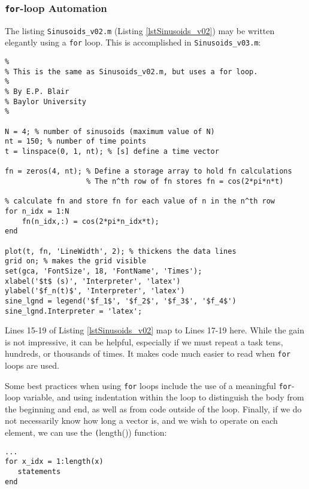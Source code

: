 \subsubsection{\texttt{for}-loop Automation}
The listing \verb!Sinusoids_v02.m! (Listing \ref{lstSinusoids_v02}) may be written elegantly using a \texttt{for} loop. This is accomplished in \verb!Sinusoids_v03.m!:
\begin{lstlisting}[style=Matlab-editor, label={Sinusoids_v03_listing}, caption={The functionality of \texttt{Sinusoids\_v02.m} is duplicated here, this time using a \texttt{for} loop.}]
% Sinusoids_v03.m
% 
% This is the same as Sinusoids_v02.m, but uses a for loop.
%
% By E.P. Blair
% Baylor University
%

N = 4; % number of sinusoids (maximum value of N)
nt = 150; % number of time points
t = linspace(0, 1, nt); % [s] define a time vector

fn = zeros(4, nt); % Define a storage array to hold fn calculations
                   % The n^th row of fn stores fn = cos(2*pi*n*t)
      
% calculate fn and store fn for each value of n in the n^th row
for n_idx = 1:N
    fn(n_idx,:) = cos(2*pi*n_idx*t);
end

plot(t, fn, 'LineWidth', 2); % thickens the data lines
grid on; % makes the grid visible
set(gca, 'FontSize', 18, 'FontName', 'Times');
xlabel('$t$ (s)', 'Interpreter', 'latex')
ylabel('$f_n(t)$', 'Interpreter', 'latex')
sine_lgnd = legend('$f_1$', '$f_2$', '$f_3$', '$f_4$')
sine_lgnd.Interpreter = 'latex';
\end{lstlisting}
Lines 15-19 of Listing \ref{lstSinusoids_v02} map to Lines  17-19 here. While the gain is not impressive, it can be helpful, especially if we must repeat a task tens, hundreds, or thousands of times. It makes code much easier to read when \texttt{for} loops are used.

Some best practices when using \texttt{for} loops include the use of a meaningful \texttt{for}-loop variable, and using indentation within the loop to distinguish the body from the beginning and end, as well as from code outside of the loop. Finally, if we do not necessarily know how long a vector is, and we wish to operate on each element, we can use the \texttt(length()) function:
\begin{lstlisting}[style=Matlab-editor, label={Sinusoids_v03_listing}, caption={The \texttt{length()} function can be used to determine the number of times a \texttt{for} loop should iterate to operate on each value of the vector \texttt{x}.}]
...
for x_idx = 1:length(x)
   statements
end
\end{lstlisting}


